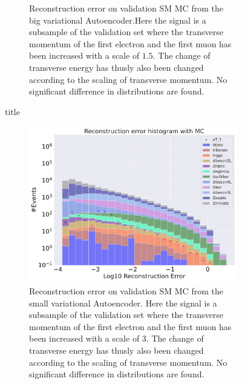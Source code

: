 \begin{figure}[h!]
\begin{subfigure}{.45\textwidth}
        \caption{Reconstruction error on validation SM MC from the big variational Autoencoder.Here the signal is a subsample of the validation 
        set where the transverse momentum of the first electron and the first muon has been increased with a scale of $1.5$. The change of transverse 
        energy has thusly also been changed according to the scaling of transverse momentum. No significant difference in distributions are found. }
        \label{fig:ae_big_pt_1_5}
    \end{subfigure}
    \hfill 
    \caption{title}
    \label{fig:ae_big_small_pt_1_5}
\end{figure}

\begin{figure}[h!]
    \centering
    \begin{subfigure}{.45\textwidth}
        \includegraphics[width=\textwidth]{Figures/AE_testing/small/b_data_recon_big_rm3_feats_sig_pT_3.pdf}
        \caption{Reconstruction error on validation SM MC from the small variational Autoencoder. Here the signal is a subsample of the validation 
        set where the transverse momentum of the first electron and the first muon has been increased with a scale of $3$. The change of transverse 
        energy has thusly also been changed according to the scaling of transverse momentum. No significant difference in distributions are found. }
        \label{fig:ae_small_pt_3}
    \end{subfigure}
    \hfill 
    \begin{subfigure}{.45\textwidth}

\end{subfigure}
\end{figure}
